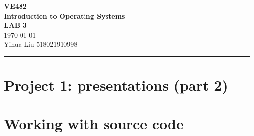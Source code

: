 \documentclass[a4paper]{article}
\begin{document}
\begin{center}
    \huge
    \textbf{VE482\\Introduction to Operating Systems\\}
    \Large
    \vspace{15pt}
    \uppercase{\textbf{Lab 3}}\\
    \large
    \vspace{5pt}\today\\
    \vspace{5pt}
    Yihua Liu 518021910998
    \vspace{5pt}
    \rule[-5pt]{.97\linewidth}{0.05em}
\end{center}
\section{Project 1: presentations (part 2)}
\section{Working with source code}
\end{document}
